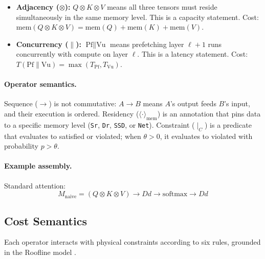\documentclass[10pt,twocolumn]{article}
\begin{document}
\begin{itemize}[nosep, leftmargin=*]
\item \textbf{Adjacency ($\otimes$):} $Q \otimes K \otimes V$ means all three tensors must reside simultaneously in the same memory level. This is a capacity statement. Cost: $\text{mem}(Q \otimes K \otimes V) = \text{mem}(Q) + \text{mem}(K) + \text{mem}(V)$.

\item \textbf{Concurrency ($\parallel$):} $\text{Pf} \parallel \text{Vu}$ means prefetching layer $\ell{+}1$ runs concurrently with compute on layer $\ell$. This is a latency statement. Cost: $T(\text{Pf} \parallel \text{Vu}) = \max(T_{\text{Pf}}, T_{\text{Vu}})$.
\end{itemize}

\paragraph{Operator semantics.} Sequence ($\rightarrow$) is not commutative: $A \rightarrow B$ means $A$'s output feeds $B$'s input, and their execution is ordered. Residency ($\langle \cdot \rangle_{\text{mem}}$) is an annotation that pins data to a specific memory level (\texttt{Sr}, \texttt{Dr}, \texttt{SSD}, or \texttt{Net}). Constraint ($\mid_C$) is a predicate that evaluates to satisfied or violated; when $\theta > 0$, it evaluates to violated with probability $p > \theta$.

\paragraph{Example assembly.} Standard attention:
\begin{equation}
\label{eq:naive}
M_{\text{naive}} = (Q \otimes K \otimes V) \rightarrow Dd \rightarrow \mathrm{softmax} \rightarrow Dd
\end{equation}

\subsection{Cost Semantics}
\label{sec:cost-model}

Each operator interacts with physical constraints according to six rules, grounded in the Roofline model \citep{williams2009}.
\end{document}
